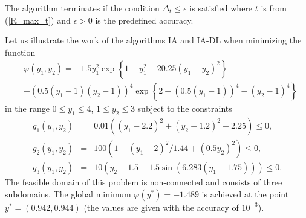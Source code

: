 \documentclass[twocolumn]{svjour3}          %
\begin{document}
The algorithm terminates if the condition $\Delta_{t} \leq \epsilon$ is satisfied where $t$ is from (\ref{R_max_t}) and $\epsilon>0$ is the predefined accuracy.

	Let us illustrate the work of the algorithms IA and IA-DL when minimizing the function
\small
\begin{align*}
	&\varphi(y_1, y_2) = -1.5y_1^2\exp{\left\{1-y_1^2-20.25(y_1-y_2)^2\right\}}-\\
	& -\left(0.5(y_1-1)(y_2-1)\right)^4 \exp{\left\{2-\left(0.5(y_1-1)\right)^4-(y_2-1)^4\right\}}
\end{align*}
\normalsize
in the range $0 \leq y_1 \leq 4$, $1 \leq y_2 \leq 3$ subject to the constraints
\small
\begin{eqnarray*}
	g_1(y_1, y_2) & = & 0.01 \left( (y_1-2.2)^2+(y_2-1.2)^2-2.25 \right) \leq 0, \\
	g_2(y_1, y_2) & = & 100 \left(1-(y_1-2)^2/1.44+(0.5y_2)^2 \right) \leq 0, \\
	g_3(y_1, y_2) & = & 10 \left( y_2 - 1.5 - 1.5 \sin{\left( 6.283(y_1-1.75) \right)}\right) \leq 0.
\end{eqnarray*}
\normalsize
The feasible domain of this problem is non-connected and consists of three subdomains. The global minimum $\varphi(y^\ast)=-1.489$ is achieved at the point \\ $y^\ast =(0.942, 0.944)$ (the values are given with the accuracy of $10^{-3}$).
\end{document}
